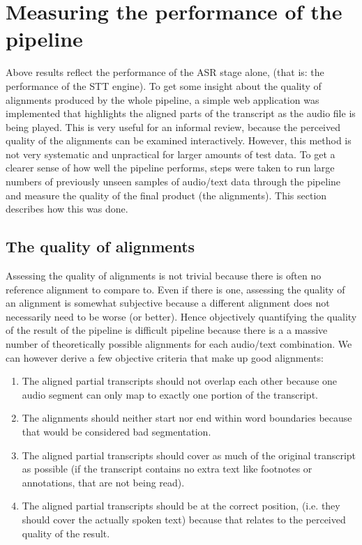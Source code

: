 \section{Measuring the performance of the pipeline}\label{e2e}

Above results reflect the performance of the \ac{ASR} stage alone, (that is: the performance of the \ac{STT} engine). To get some insight about the quality of alignments produced by the whole pipeline, a simple web application was implemented that highlights the aligned parts of the transcript as the audio file is being played. This is very useful for an informal review, because the perceived quality of the alignments can be examined interactively. However, this method is not very systematic and unpractical for larger amounts of test data. To get a clearer sense of how well the pipeline performs, steps were taken to run large numbers of previously unseen samples of audio/text data through the pipeline and measure the quality of the final product (the alignments). This section describes how this was done.

\subsection{The quality of alignments}

Assessing the quality of alignments is not trivial because there is often no reference alignment to compare to. Even if there is one, assessing the quality of an alignment is somewhat subjective because a different alignment does not necessarily need to be worse (or better). Hence objectively quantifying the quality of the result of the pipeline is difficult pipeline because there is a a massive number of theoretically possible alignments for each audio/text combination. We can however derive a few objective criteria that make up good alignments:

\begin{enumerate}
	\item The aligned partial transcripts should not overlap each other because one audio segment can only map to exactly one portion of the transcript.
	\item The alignments should neither start nor end within word boundaries because that would be considered bad segmentation.
	\item The aligned partial transcripts should cover as much of the original transcript as possible (if the transcript contains no extra text like footnotes or annotations, that are not being read).
	\item The aligned partial transcripts should be at the correct position, (i.e. they should cover the actually spoken text) because that relates to the perceived quality of the result.
\end{enumerate}

